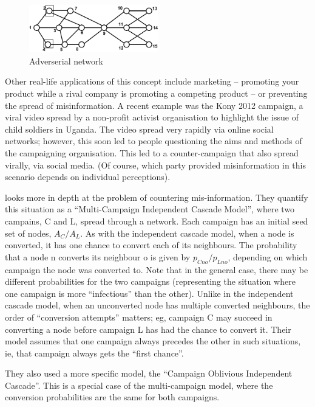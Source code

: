 \begin{figure}[htbp]
\centering
\includegraphics[width=0.5\textwidth]{./img/adversial_network.png}
\caption{Adverserial network}
\label{fig:adverserial_network}
\end{figure}

Other real-life applications of this concept include marketing -- promoting your product while a rival company is promoting a competing product -- or preventing the spread of misinformation. A recent example was the Kony 2012 campaign, a viral video spread by a non-profit activist organisation to highlight the issue of child soldiers in Uganda. The video spread very rapidly via online social networks; however, this soon led to people questioning the aims and methods of the campaigning organisation. This led to a counter-campaign that also spread virally, via social media. (Of course, which party provided misinformation in this scenario depends on individual perceptions).

\cite{budak} looks more in depth at the problem of countering mis-information. They quantify this situation as a ``Multi-Campaign Independent Cascade Model'', where two campains, C and L, spread through a network. Each campaign has an initial seed set of nodes, \(A_C/A_L\). As with the independent cascade model, when a node is converted, it has one chance to convert each of its neighbours. The probability that a node n converts its neighbour o is given by \(p_{Cno} / p_{Lno}\), depending on which campaign the node was converted to. Note that in the general case, there may be different probabilities for the two campaigns (representing the situation where one campaign is more ``infectious'' than the other). Unlike in the independent cascade model, when an unconverted node has multiple converted neighbours, the order of ``conversion attempts'' matters; eg, campaign C may succeed in converting a node before campaign L has had the chance to convert it. Their model assumes that one campaign always precedes the other in such situations, ie, that campaign always gets the ``first chance''.

They also used a more specific model, the ``Campaign Oblivious Independent Cascade''. This is a special case of the multi-campaign model, where the conversion probabilities are the same for both campaigns.

